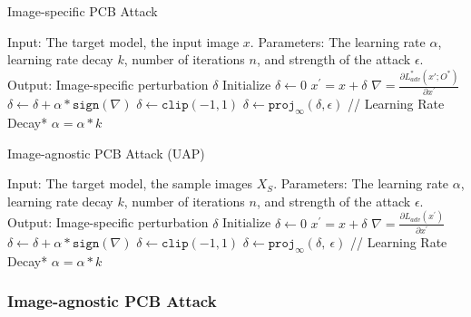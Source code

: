 \begin{algorithm}[H]
    \caption{Image-specific PCB Attack}\label{alg:image-specific}
    \begin{algorithmic}[1]
        \State Input: The target model, the input image $x$.
        \State Parameters: The learning rate $\alpha$, learning rate decay $k$, number of iterations $n$, and strength of the attack $\epsilon$.
        \State Output: Image-specific perturbation $\delta$
        \State Initialize $\delta \leftarrow 0$
            \State $x^{'} = x + \delta$  
            \State $\nabla = \frac{\partial L_{adv}^*(x';O^*)}{\partial x^{'}}$
            \State $\delta \leftarrow \delta + \alpha * \texttt{sign}(\nabla)$
            \State $\delta \leftarrow \texttt{clip}(-1, 1)$
            \State $\delta \leftarrow  \texttt{proj}_{\infty}(\delta,\epsilon)$ 
            \State // Learning Rate Decay*
            \State $\alpha = \alpha * k$ %
        \EndFor
    \end{algorithmic}
\end{algorithm}

\begin{algorithm}[H]
    \caption{Image-agnostic PCB Attack (UAP)}\label{alg:image-agnostic}
    \begin{algorithmic}[1]
        \State Input: The target model, the sample images $X_S$.
        \State Parameters: The learning rate $\alpha$, learning rate decay $k$, number of iterations $n$, and strength of the attack $\epsilon$.
        \State Output: Image-specific perturbation $\delta$
        \State Initialize $\delta \leftarrow 0$
                \State $x^{'} = x + \delta$  
                \State $\nabla = \frac{\partial L_{adv}(x^{'})}{\partial x^{'}}$
                \State $\delta \leftarrow \delta + \alpha * \texttt{sign}(\nabla)$ %
                \State $\delta \leftarrow \texttt{clip}(-1, 1)$
                \State $\delta \leftarrow  \texttt{proj}_{\infty}(\delta,\ \epsilon)$ 
            \EndFor
        \State // Learning Rate Decay*
        \State $\alpha = \alpha * k$
        \EndFor
    \end{algorithmic}
\end{algorithm}

\subsubsection{\textbf{Image-agnostic PCB Attack}}

